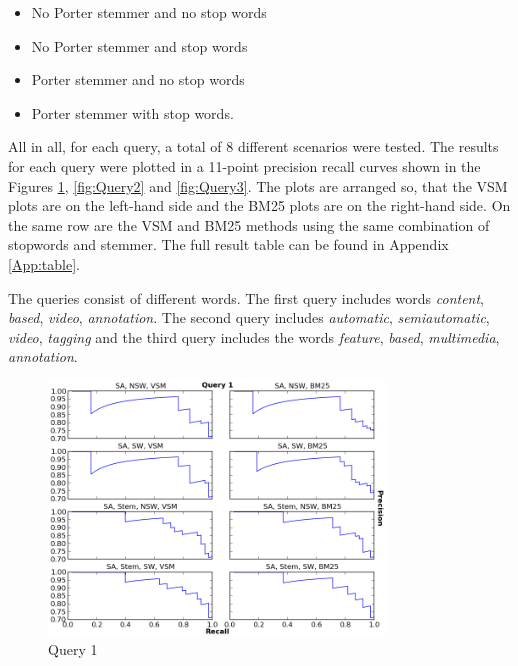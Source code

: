 \begin{itemize}
\item No Porter stemmer and no stop words
\item No Porter stemmer and stop words 
\item Porter stemmer and no stop words
\item Porter stemmer with stop words.
\end{itemize}

All in all, for each query, a total of 8 different scenarios were tested. The results for each query were plotted in a 11-point precision recall curves shown in the Figures \ref{fig:Query1}, \ref{fig:Query2} and \ref{fig:Query3}. The plots are arranged so, that the VSM plots are on the left-hand side and the BM25 plots are on the right-hand side. On the same row are the VSM and BM25 methods using the same combination of stopwords and stemmer. The full result table can be found in Appendix \ref{App:table}. 

The queries consist of different words. The first query includes words \textit{content}, \textit{based}, \textit{video}, \textit{annotation}. The second query includes  \textit{automatic}, \textit{semiautomatic}, \textit{video}, \textit{tagging} and the third query includes the words \textit{feature}, \textit{based}, \textit{multimedia}, \textit{annotation}. 


\begin{figure}[ht]
  \centering
  \includegraphics[width=0.8\textwidth]{Query1.png}
  \caption{Query 1 }
  \label{fig:Query1}
\end{figure}
\FloatBarrier

